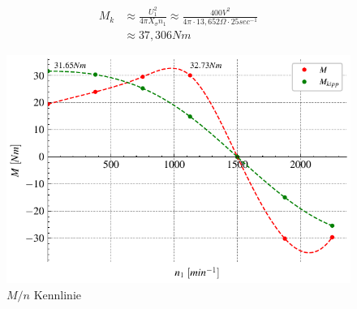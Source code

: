 \documentclass[conference]{IEEEtran}
\begin{document}
\begin{align}
    M_{k} & \approx \frac{U_{1}^{2}}{4 \pi X_{\sigma} n_{1}} \approx \frac{400\si{V}^{2}}{4 \pi\cdot 13,652 \Omega \cdot 25 \si{sec^{-1}}} \\
          & \approx 37,306 \si{Nm}
    \label{eq:M_k-mit-R_1}
\end{align}




\begin{figure}[htbp]
    \centering
    \includegraphics[width=\columnwidth]{./figures/m_n-kennlinie.pdf}
    \caption{$M/n$ Kennlinie}
    \label{fig:trennung_von_eisen_reib}
\end{figure}
\end{document}
